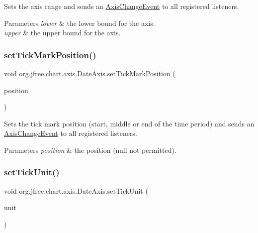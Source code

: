 Sets the axis range and sends an \mbox{\hyperlink{}{Axis\+Change\+Event}} to all registered listeners.


\begin{DoxyParams}{Parameters}
{\em lower} & the lower bound for the axis. \\
\hline
{\em upper} & the upper bound for the axis. \\
\hline
\end{DoxyParams}
\mbox{\label{classorg_1_1jfree_1_1chart_1_1axis_1_1_date_axis_a037470feb7fc76789517fe5f16cd7021}} 
\subsubsection{\texorpdfstring{set\+Tick\+Mark\+Position()}{setTickMarkPosition()}}
{\footnotesize\ttfamily void org.\+jfree.\+chart.\+axis.\+Date\+Axis.\+set\+Tick\+Mark\+Position (\begin{DoxyParamCaption}\item[{\mbox{\hyperlink{classorg_1_1jfree_1_1chart_1_1axis_1_1_date_tick_mark_position}{Date\+Tick\+Mark\+Position}}}]{position }\end{DoxyParamCaption})}

Sets the tick mark position (start, middle or end of the time period) and sends an \mbox{\hyperlink{}{Axis\+Change\+Event}} to all registered listeners.


\begin{DoxyParams}{Parameters}
{\em position} & the position ({\ttfamily null} not permitted). \\
\hline
\end{DoxyParams}
\mbox{\label{classorg_1_1jfree_1_1chart_1_1axis_1_1_date_axis_a9a28298c67b281bc6f4dccff9af3fd59}} 
\subsubsection{\texorpdfstring{set\+Tick\+Unit()}{setTickUnit()}\hspace{0.1cm}{\footnotesize\ttfamily [1/2]}}
{\footnotesize\ttfamily void org.\+jfree.\+chart.\+axis.\+Date\+Axis.\+set\+Tick\+Unit (\begin{DoxyParamCaption}\item[{\mbox{\hyperlink{classorg_1_1jfree_1_1chart_1_1axis_1_1_date_tick_unit}{Date\+Tick\+Unit}}}]{unit }\end{DoxyParamCaption})}

